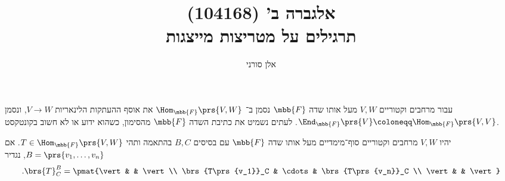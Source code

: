 \documentclass[a4paper,10pt,twoside,openany]{article}
\title{
אלגברה ב' (104168)  \\
תרגילים על מטריצות מייצגות
}
\author{אלן סורני}
\begin{document}
\maketitle

\begin{notation}
עבור מרחבים וקטוריים
$V,W$
מעל אותו שדה
$\mbb{F}$
נסמן ב־%
$\Hom_{\mbb{F}}\prs{V,W}$
את אוסף ההעתקות הלינאריות
$V \to W$,
ונסמן
$\End_{\mbb{F}}\prs{V} \coloneqq \Hom_{\mbb{F}}\prs{V,V}$.
לעתים נשמיט את כתיבת השדה
$\mbb{F}$
מהסימון, כשהוא ידוע או לא חשוב בקונטקסט.
\end{notation}

\begin{notation}
יהיו
$V,W$
מרחבים וקטוריים סוף־מימדיים מעל אותו שדה
$\mbb{F}$
עם בסיסים
$B,C$
בהתאמה
ותהי
$T \in \Hom_{\mbb{F}}\prs{V,W}$.
אם
$B = \prs{v_1, \ldots, v_n}$,
נגדיר
\[\text{.} \brs{T}^B_C = \pmat{\vert & & \vert \\ \brs{T\prs{v_1}}_C & \cdots & \brs{T\prs{v_n}}_C \\ \vert & & \vert}\]
\end{notation}
\end{document}
